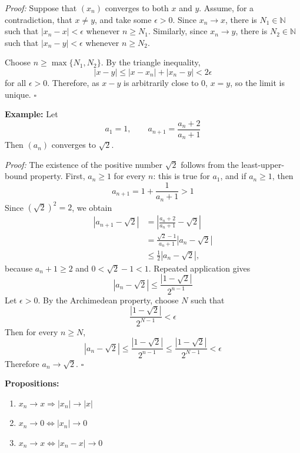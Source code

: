 \documentclass[a4paper,11pt,abstracton]{scrartcl}
\newcommand{\NN}{\mathbb{N}}
\theoremstyle{dotlessP}
\theoremstyle{dotlessS}
\theoremstyle{remark}
\theoremstyle{definition}
\begin{document}
\begin{claim_box}
\textit{Proof:}
Suppose that $(x_n)$ converges to both $x$ and $y$. Assume, for a
contradiction, that $x\ne y$, and take some $\epsilon > 0$.
Since $x_n\to x$, there is $N_1\in\NN$ such that
$|x_n-x|<\epsilon$ whenever $n\ge N_1$. Similarly, since $x_n\to y$,
there is $N_2\in\NN$ such that $|x_n-y|<\epsilon$ whenever
$n\ge N_2$.

Choose $n\ge\max\{N_1,N_2\}$. By the triangle inequality,
$$    |x-y|
    \le |x-x_n|+|x_n-y|
    <2\epsilon
$$
for all $\epsilon>0$. Therefore, as $x-y$ is arbitrarily close to 0, $x=y$, so the limit is unique.
\hfill$\square$
\end{claim_box}

\begin{example_box}
\textbf{Example:} Let
\[
    a_1=1,
    \qquad
    a_{n+1}=\frac{a_n+2}{a_n+1}
\]
Then $(a_n)$ converges to $\sqrt{2}$.

\textit{Proof:}
The existence of the positive number $\sqrt{2}$ follows from the
least-upper-bound property. First, $a_n\ge1$ for every $n$: this is true
for $a_1$, and if $a_n\ge1$, then
\[
    a_{n+1}=1+\frac{1}{a_n+1}>1
\]
Since $(\sqrt{2})^2=2$, we obtain
\[
\begin{aligned}
    \left|a_{n+1}-\sqrt{2}\right|
    &=\left|\frac{a_n+2}{a_n+1}-\sqrt{2}\right|\\
    &=\frac{\sqrt{2}-1}{a_n+1}
      \left|a_n-\sqrt{2}\right|\\
    &\le\frac12\left|a_n-\sqrt{2}\right|,
\end{aligned}
\]
because $a_n+1\ge2$ and $0<\sqrt{2}-1<1$. Repeated application gives
\[
    \left|a_n-\sqrt{2}\right|
    \le \frac{|1-\sqrt{2}|}{2^{n-1}}
\]
Let $\epsilon>0$. By the Archimedean property, choose $N$ such that
\[
    \frac{|1-\sqrt{2}|}{2^{N-1}}<\epsilon
\]
Then for every $n\ge N$,
\[
    |a_n-\sqrt{2}|
    \le\frac{|1-\sqrt{2}|}{2^{n-1}}
    \le\frac{|1-\sqrt{2}|}{2^{N-1}}
    <\epsilon
\]
Therefore $a_n\to\sqrt{2}$.
\hfill$\square$
\end{example_box}

\begin{problem_box}
\textbf{Propositions:}
\begin{enumerate}
\item $x_n \rightarrow x \Rightarrow |x_n| \rightarrow |x|$
\item $x_n \rightarrow 0 \iff |x_n| \rightarrow 0$
\item $x_n \rightarrow x \iff |x_n-x| \rightarrow 0$
\end{enumerate}
\end{problem_box}
\end{document}
